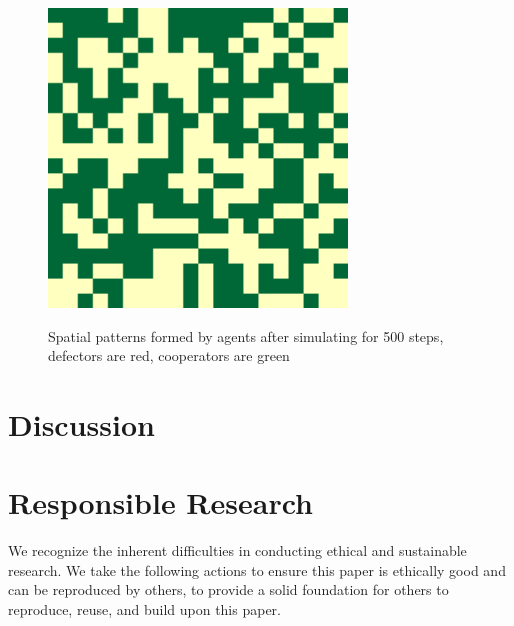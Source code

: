\documentclass[english]{article}
\begin{document}
\begin{figure}[!h]
{    \includegraphics[width=\textwidth/3]{spatial-memory1+gossip1+range3-C.pdf}
  }
  \caption{Spatial patterns formed by agents after simulating for 500 steps, defectors are red, cooperators are green}
  \label{fig:spatial}
\end{figure}





\section{Discussion}






\section{Responsible Research}
We recognize the inherent difficulties in conducting ethical and sustainable research.
We take the following actions to ensure this paper is ethically good
and can be reproduced by others, to provide a solid foundation for others to reproduce, reuse, and build upon this paper.
\end{document}

